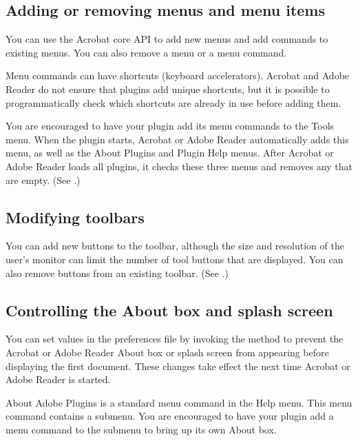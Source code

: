 \documentclass[letterpaper,12pt,english,openany,oneside]{sphinxmanual}
\begin{document}
\subsection{Adding or removing menus and menu items}
\label{\detokenize{Plugins_Pimech:adding-or-removing-menus-and-menu-items}}
You can use the Acrobat core API to add new menus and add commands to existing menus. You can also remove a menu or a menu command.

Menu commands can have shortcuts (keyboard accelerators). Acrobat and Adobe Reader do not ensure that plugins add unique shortcuts, but it is possible to programmatic\sphinxhyphen{}ally check which shortcuts are already in use before adding them.

You are encouraged to have your plugin add its menu commands to the Tools menu. When the plugin starts, Acrobat or Adobe Reader automatically adds this menu, as well as the About Plugins and Plugin Help menus. After Acrobat or Adobe Reader loads all plugins, it checks these three menus and removes any that are empty. (See .)


\subsection{Modifying toolbars}
\label{\detokenize{Plugins_Pimech:modifying-toolbars}}
You can add new buttons to the toolbar, although the size and resolution of the user’s monitor can limit the number of tool buttons that are displayed. You can also remove buttons from an existing toolbar. (See .)


\subsection{Controlling the About box and splash screen}
\label{\detokenize{Plugins_Pimech:controlling-the-about-box-and-splash-screen}}
You can set values in the preferences file by invoking the  method to prevent the Acrobat or Adobe Reader About box or splash screen from appearing before displaying the first document. These changes take effect the next time Acrobat or Adobe Reader is started.

About Adobe Plugins is a standard menu command in the Help menu. This menu command contains a submenu. You are encouraged to have your plugin add a menu command to the submenu to bring up its own About box.
\end{document}
